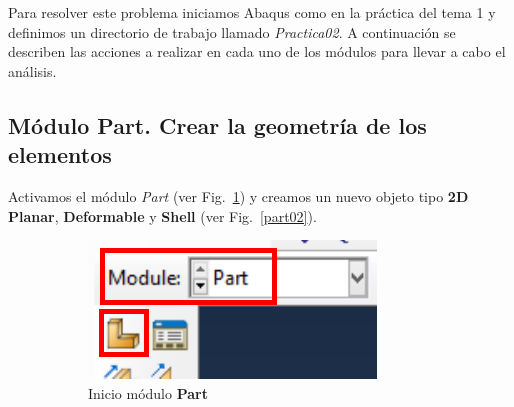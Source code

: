 Para resolver este problema iniciamos Abaqus como en la práctica del tema 1 y 
definimos un directorio de trabajo llamado \textit{Practica02}. A continuación
se describen las acciones a realizar en cada uno de los módulos para llevar
a cabo el análisis. 

\subsection{Módulo Part. Crear la geometría de los elementos}
Activamos el módulo \textit{Part} (ver Fig.~\ref{part01}) y creamos un
nuevo objeto tipo \textbf{2D Planar}, \textbf{Deformable} y
\textbf{Shell} (ver Fig.~\ref{part02}).

  \begin{figure}
    \centering
    \begin{subfigure}[!h]{0.29\textwidth}
      \includegraphics[width=\textwidth]{./body/images/part01.pdf}
      \caption{Inicio módulo \textbf{Part}}
      \label{part01}
    \end{subfigure}%
    ~ %
    \begin{subfigure}[!h]{0.39\textwidth}

\end{subfigure}
\end{figure}
